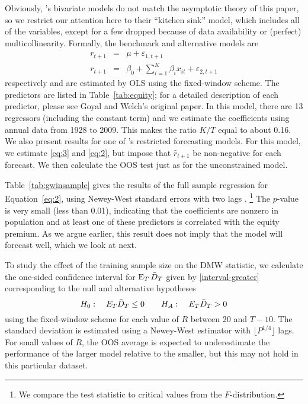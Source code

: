\documentclass[11pt]{article}
\newcommand{\e}{\varepsilon}
\newcommand{\citepos}[1]{\citeauthor{#1}'s \citeyearpar{#1}}
\begin{document}
Obviously, \citepos{GoW:08} bivariate models do not
match the asymptotic theory of this paper, so we restrict our
attention here to their ``kitchen sink'' model, which includes all of
the variables, except for a few dropped because of data availability or
(perfect) multicollinearity.  Formally, the benchmark and alternative models are
\begin{eqnarray}
  \label{eq:3}
  r_{t+1} &=& \mu + \e_{1,t+1} \\
  \label{eq:2}
r_{t+1} &=& \beta_0 + \sum_{i=1}^K \beta_{i} x_{it} + \e_{2,t+1}
\end{eqnarray}
respectively and are estimated by OLS using the fixed-window scheme.
The predictors are listed in Table~\ref{tab:equity}; for a detailed
description of each predictor, please see Goyal and Welch's original
paper.  In this model, there are 13 regressors (including the constant
term) and we estimate the coefficients using annual data from 1928 to
2009.  This makes the ratio $K/T$ equal to about 0.16.  We also
present results for one of \citepos{CaT:08}
restricted forecasting models.  For this model, we estimate
\eqref{eq:3} and \eqref{eq:2}, but impose that $\hat r_{t+1}$ be
non-negative for each forecast.  We then calculate the OOS test just
as for the unconstrained model.

Table~\ref{tab:gwinsample} gives the results of the full sample
regression for Equation~\eqref{eq:2}, using Newey-West standard errors
with two lags \citep{NeW:87}.%
\footnote{We compare the test statistic
  to critical values from the $F$-distribution.} %
The $p$-value is
very small (less than 0.01), indicating that the coefficients are
nonzero in population and at least one of these predictors is
correlated with the equity premium.  As we argue earlier, this result
does not imply that the model will forecast well, which we look at
next.

To study the effect of the training sample size on the DMW statistic, we
calculate the one-sided confidence interval for $\operatorname{E}_T \bar{D}_{T}$ given
by \eqref{interval-greater} corresponding to the null and alternative
hypotheses
\[ H_0: \quad E_T \bar{D}_{T} \leq 0 \qquad
H_A: \quad E_T \bar{D}_{T} > 0
\]
using the fixed-window scheme for each value of $R$ between 20 and
$T-10$.  The standard deviation is estimated using a Newey-West
estimator with $\lfloor P^{1/4}\rfloor$ lags.  For small values of
$R$, the OOS average is expected to underestimate the performance of
the larger model relative to the smaller, but this may not hold in
this particular dataset.
\end{document}
